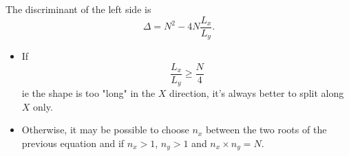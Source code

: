\documentclass[aps]{revtex4}
\begin{document}
The discriminant of the left side is 
\begin{equation}
	\Delta = N^2 - 4 N \dfrac{L_x}{L_y}.
\end{equation}
\begin{itemize}
	\item If 
		\begin{equation}
		\dfrac{L_x}{L_y}\geq \dfrac{N}{4}
		\end{equation}
		ie the shape is too "long" in the $X$ direction, it's always better to split along $X$ only.
	\item Otherwise, it may be possible to choose $n_x$ between the two roots of the previous equation
	and if $n_x>1$, $n_y>1$ and $n_x \times n_y = N$.
\end{itemize}
\end{document}
